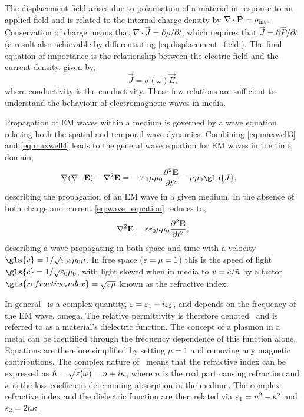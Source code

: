 \documentclass{article}
\begin{document}
The displacement field arises due to polarisation of a material in response to an applied field and is related to the internal charge density by $\nabla\cdot\mathbf{P}=\rho_{\mathrm{int}}$. Conservation of charge means that $\nabla\cdot\vec{J}=\partial\rho/\partial t$, which requires that $\vec{J}=\partial\vec{P}/\partial t$ (a result also achievable by differentiating \eqref{eq:displacement_field}). The final equation of importance is the relationship between the electric field and the current density, given by,
\begin{equation}
	\vec{J} = \sigma(\omega)\vec{E},
	\label{eq:current_density}
\end{equation}
where \gls{conductivity} is the conductivity. These few relations are sufficient to understand the behaviour of electromagnetic waves in media.

Propagation of EM waves within a medium is governed by a wave equation relating both the spatial and temporal wave dynamics. Combining \eqref{eq:maxwell3} and \eqref{eq:maxwell4} leads to the general wave equation for EM waves in the time domain,
\begin{align}
	\nabla(\nabla\cdot\vec{E}) - \nabla^2\vec{E} &= -\eps\epsfs\mu\mu_0\frac{\partial^2\vec{E}}{\partial t^2} - \mu\mu_0\gls{J},
	\label{eq:wave_equation}
\end{align}
describing the propagation of an EM wave in a given medium.
In the absence of both charge and current \eqref{eq:wave_equation} reduces to,
\begin{equation}
	\nabla^2\mathbf{E} = \varepsilon\varepsilon_0\mu\mu_0\frac{\partial^2\mathbf{E}}{\partial t^2},
\end{equation}
describing a wave propagating in both space and time with a velocity $\gls{v}=1/\sqrt{\epsfs\eps\mu_0\mu}$. In free space ($\varepsilon=\mu=1$) this is the speed of light $\gls{c}=1/\sqrt{\epsfs\mu_0}$, with light slowed when in media to $v=c/\tilde{n}$ by a factor $\gls{refractive_index}=\sqrt{\eps\mu}$ known as the refractive index.

In general \eps\ is a complex quantity, $\varepsilon=\varepsilon_1+i\varepsilon_2$, and depends on the frequency of the EM wave, \gls{omega}. The relative permittivity is therefore denoted \dielectric\ and is referred to as a material's dielectric function. The concept of a plasmon in a metal can be identified through the frequency dependence of this function alone. Equations are therefore simplified by setting $\mu=1$ and removing any magnetic contributions.
The complex nature of \dielectric\ means that the refractive index can be expressed as $\tilde{n}=\sqrt{\varepsilon(\omega)}=n+i\kappa$, where $n$ is the real part causing refraction and $\kappa$ is the loss coefficient determining absorption in the medium. The complex refractive index and the dielectric function are then related via $\varepsilon_1=n^2-\kappa^2$ and $\varepsilon_2 = 2n\kappa$.
\end{document}
